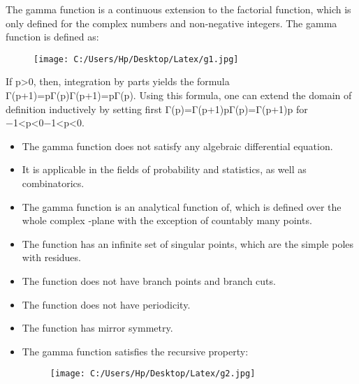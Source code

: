 \documentclass[11pt]{article}
\begin{document}
The gamma function is a continuous extension to the factorial function, which is only defined for the complex numbers and non-negative integers. The gamma function is defined as:
\begin{figure} [h]
	\centering
	\texttt{[image: C:/Users/Hp/Desktop/Latex/g1.jpg]}
\end{figure} 
\newline
If p>0, then, integration by parts yields the formula Γ(p+1)=pΓ(p)Γ(p+1)=pΓ(p). Using this formula, one can extend the domain of definition inductively by setting first Γ(p)=Γ(p+1)pΓ(p)=Γ(p+1)p for −1<p<0−1<p<0.
\begin{itemize}
	\item The gamma function does not satisfy any algebraic differential equation.
	\item It is applicable in the fields of probability and statistics, as well as combinatorics.
\item The gamma function  is an analytical function of, which is defined over the whole complex ‐plane with the exception of countably many points.
\item The function has an infinite set of singular points, which are the simple poles with residues. 
\item The function  does not have branch points and branch cuts.
\item The function  does not have periodicity.
\item The function  has mirror symmetry.
\item The gamma function satisfies the recursive property:
\begin{figure} [h]
	\centering
	\texttt{[image: C:/Users/Hp/Desktop/Latex/g2.jpg]}
\end{figure}
\end{itemize}

\newpage
\end{document}
